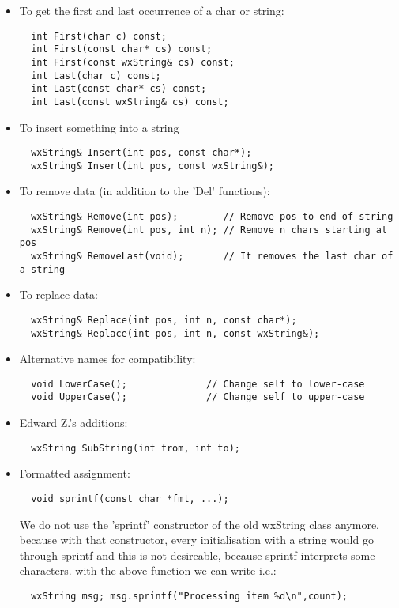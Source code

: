 \begin{itemize}
\item To get the first and last occurrence of a char or string:
\begin{verbatim}
  int First(char c) const;
  int First(const char* cs) const;
  int First(const wxString& cs) const;
  int Last(char c) const;
  int Last(const char* cs) const;
  int Last(const wxString& cs) const;
\end{verbatim}
  
\item To insert something into a string              
\begin{verbatim}
  wxString& Insert(int pos, const char*);
  wxString& Insert(int pos, const wxString&);
\end{verbatim}

\item To remove data (in addition to the 'Del' functions):
\begin{verbatim}
  wxString& Remove(int pos);        // Remove pos to end of string
  wxString& Remove(int pos, int n); // Remove n chars starting at pos
  wxString& RemoveLast(void);       // It removes the last char of a string
\end{verbatim}

\item To replace data:
\begin{verbatim}
  wxString& Replace(int pos, int n, const char*);
  wxString& Replace(int pos, int n, const wxString&);
\end{verbatim}

\item Alternative names for compatibility:
\begin{verbatim}
  void LowerCase();              // Change self to lower-case
  void UpperCase();              // Change self to upper-case
\end{verbatim}

\item Edward Z.'s additions:
\begin{verbatim}
  wxString SubString(int from, int to);
\end{verbatim}

\item Formatted assignment:
\begin{verbatim}
  void sprintf(const char *fmt, ...);
\end{verbatim}
We do not use the 'sprintf' constructor of the old wxString class anymore, 
because with that constructor, every initialisation with a string would 
go through sprintf and this is not desireable, because sprintf interprets
some characters. with the above function we can write i.e.:
\begin{verbatim}
  wxString msg; msg.sprintf("Processing item %d\n",count);
\end{verbatim}
  

\end{itemize}
